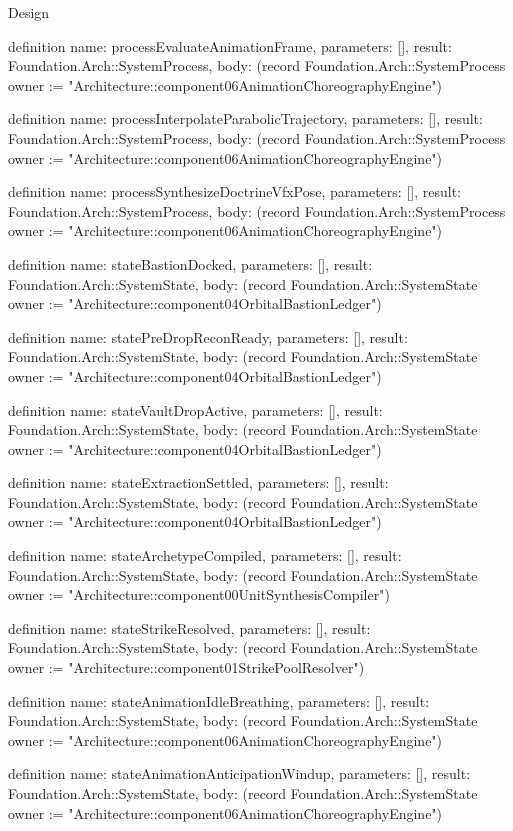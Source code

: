 \begin{lexlean}{Design}
\begin{semanticmodule}
definition{
  name: processEvaluateAnimationFrame,
  parameters: [],
  result: Foundation.Arch::SystemProcess,
  body: (record Foundation.Arch::SystemProcess {owner := "Architecture::component06AnimationChoreographyEngine"})
}

definition{
  name: processInterpolateParabolicTrajectory,
  parameters: [],
  result: Foundation.Arch::SystemProcess,
  body: (record Foundation.Arch::SystemProcess {owner := "Architecture::component06AnimationChoreographyEngine"})
}

definition{
  name: processSynthesizeDoctrineVfxPose,
  parameters: [],
  result: Foundation.Arch::SystemProcess,
  body: (record Foundation.Arch::SystemProcess {owner := "Architecture::component06AnimationChoreographyEngine"})
}

definition{
  name: stateBastionDocked,
  parameters: [],
  result: Foundation.Arch::SystemState,
  body: (record Foundation.Arch::SystemState {owner := "Architecture::component04OrbitalBastionLedger"})
}

definition{
  name: statePreDropReconReady,
  parameters: [],
  result: Foundation.Arch::SystemState,
  body: (record Foundation.Arch::SystemState {owner := "Architecture::component04OrbitalBastionLedger"})
}

definition{
  name: stateVaultDropActive,
  parameters: [],
  result: Foundation.Arch::SystemState,
  body: (record Foundation.Arch::SystemState {owner := "Architecture::component04OrbitalBastionLedger"})
}

definition{
  name: stateExtractionSettled,
  parameters: [],
  result: Foundation.Arch::SystemState,
  body: (record Foundation.Arch::SystemState {owner := "Architecture::component04OrbitalBastionLedger"})
}

definition{
  name: stateArchetypeCompiled,
  parameters: [],
  result: Foundation.Arch::SystemState,
  body: (record Foundation.Arch::SystemState {owner := "Architecture::component00UnitSynthesisCompiler"})
}

definition{
  name: stateStrikeResolved,
  parameters: [],
  result: Foundation.Arch::SystemState,
  body: (record Foundation.Arch::SystemState {owner := "Architecture::component01StrikePoolResolver"})
}

definition{
  name: stateAnimationIdleBreathing,
  parameters: [],
  result: Foundation.Arch::SystemState,
  body: (record Foundation.Arch::SystemState {owner := "Architecture::component06AnimationChoreographyEngine"})
}

definition{
  name: stateAnimationAnticipationWindup,
  parameters: [],
  result: Foundation.Arch::SystemState,
  body: (record Foundation.Arch::SystemState {owner := "Architecture::component06AnimationChoreographyEngine"})
}


\end{semanticmodule}
\end{lexlean}
